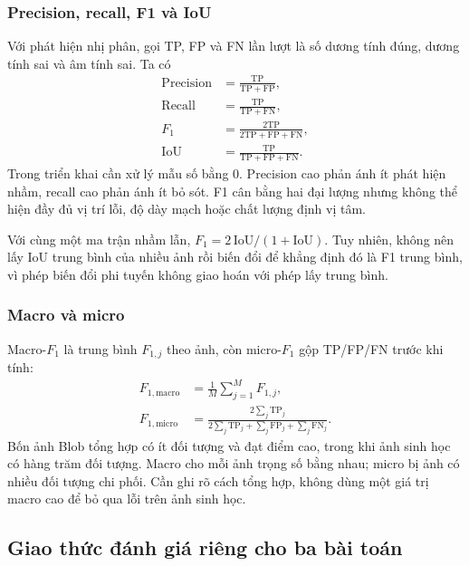\subsubsection{Precision, recall, F1 và IoU}
Với phát hiện nhị phân, gọi TP, FP và FN lần lượt là số dương tính đúng, dương tính sai và âm tính sai. Ta có
\begin{align}
\mathrm{Precision}&=\frac{\mathrm{TP}}{\mathrm{TP}+\mathrm{FP}},\\
\mathrm{Recall}&=\frac{\mathrm{TP}}{\mathrm{TP}+\mathrm{FN}},\\
F_1&=\frac{2\mathrm{TP}}{2\mathrm{TP}+\mathrm{FP}+\mathrm{FN}},\\
\mathrm{IoU}&=\frac{\mathrm{TP}}{\mathrm{TP}+\mathrm{FP}+\mathrm{FN}}.
\end{align}
Trong triển khai cần xử lý mẫu số bằng 0. Precision cao phản ánh ít phát hiện nhầm, recall cao phản ánh ít bỏ sót. F1 cân bằng hai đại lượng nhưng không thể hiện đầy đủ vị trí lỗi, độ dày mạch hoặc chất lượng định vị tâm.

Với cùng một ma trận nhầm lẫn, $F_1=2\,\mathrm{IoU}/(1+\mathrm{IoU})$. Tuy nhiên, không nên lấy IoU trung bình của nhiều ảnh rồi biến đổi để khẳng định đó là F1 trung bình, vì phép biến đổi phi tuyến không giao hoán với phép lấy trung bình.

\subsubsection{Macro và micro}
Macro-$F_1$ là trung bình $F_{1,j}$ theo ảnh, còn micro-$F_1$ gộp TP/FP/FN trước khi tính:
\begin{equation}
\begin{aligned}
F_{1,\mathrm{macro}} &= \frac{1}{M}\sum_{j=1}^{M}F_{1,j}, \\
F_{1,\mathrm{micro}} &=
\frac{2\sum_j\mathrm{TP}_j}
{2\sum_j\mathrm{TP}_j+\sum_j\mathrm{FP}_j+\sum_j\mathrm{FN}_j}.
\end{aligned}
\end{equation}
Bốn ảnh Blob tổng hợp có ít đối tượng và đạt điểm cao, trong khi ảnh sinh học có hàng trăm đối tượng. Macro cho mỗi ảnh trọng số bằng nhau; micro bị ảnh có nhiều đối tượng chi phối. Cần ghi rõ cách tổng hợp, không dùng một giá trị macro cao để bỏ qua lỗi trên ảnh sinh học.

\subsection{Giao thức đánh giá riêng cho ba bài toán}
